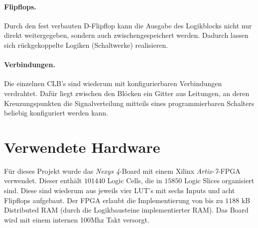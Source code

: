 \paragraph{Flipflops.} Durch den fest verbauten D-Flipflop kann die Ausgabe des Logikblocks nicht nur direkt weitergegeben, sondern auch zwischengespeichert werden. Dadurch lassen sich rückgekoppelte Logiken (Schaltwerke) realisieren. \cite[S. 13]{Chu}

\paragraph{Verbindungen.} Die einzelnen CLB's sind wiederum mit konfigurierbaren Verbindungen verdrahtet. Dafür liegt zwischen den Blöcken ein Gitter aus Leitungen, an deren Kreuzungspunkten die Signalverteilung mitteils eines programmierbaren Schalters beliebig konfiguriert werden kann. \cite[S. 12]{Chu}

\section{Verwendete Hardware}
Für dieses Projekt wurde das \emph{Nexys 4}-Board mit einem Xilinx \emph{Artix-7}-FPGA verwendet. Dieser enthält $101440$ Logic Cells, die in $15850$ Logic Slices organisiert sind. Diese sind wiederum aus jeweils vier LUT's mit sechs Inputs und acht Flipflops aufgebaut. Der FPGA erlaubt die Implementierung von bis zu $1188$ kB Distributed RAM (durch die Logikbausteine implementierter RAM). Das Board wird mit einem internen 100Mhz Takt versorgt. \cite{Artix}